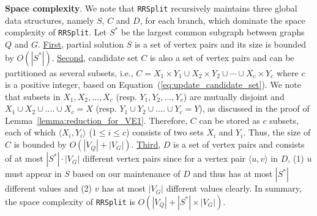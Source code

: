 \smallskip
\noindent\textbf{Space complexity}. We note that \texttt{RRSplit} recursively maintains three global data structures, namely $S$, $C$ and $D$, for each branch, which dominate the space complexity of \texttt{RRSplit}. Let $S^*$ be the largest common subgraph between  graphs $Q$ and $G$. \underline{First}, partial solution $S$ is a set of vertex pairs and its size is bounded by $O(|S^*|)$. \underline{Second}, candidate set $C$ is also a set of vertex pairs and can be partitioned as several subsets, i.e., $C= X_1\times Y_1 \cup  X_2\times Y_2\cup\cdots\cup X_c\times Y_c$ where $c$ is a positive integer, based on Equation~(\ref{eq:update_candidate_set}). We note that subsets in $X_1,X_2,...,X_c$ (resp. $Y_1,Y_2,...,Y_c$) are mutually disjoint and $X_1\cup X_2\cup .... \cup X_c=X$ (resp. $Y_1\cup Y_2\cup .... \cup Y_c=Y$), as discussed in the proof of Lemma~\ref{lemma:reduction_for_VE1}. Therefore, $C$ can be stored {\chengC as} $c$ subsets, each of which $\langle X_i,Y_i\rangle$ ($1\leq i\leq c$) consists of two sets $X_i$ and $Y_i$. Thus, the size of $C$ is bounded by $O(|V_Q|+|V_G|)$. \underline{Third}, $D$ is a set of vertex pairs and consists of at most $|S^*|\cdot |V_G|$ different vertex pairs since for a vertex pair $\langle u,v \rangle$ in $D$, (1) $u$ must {\chengB appear} in $S$ based on our maintenance of $D$ and thus has at most $|S^*|$ different values and (2) $v$ has at most $|V_G|$ different values clearly. In summary, the space complexity of \texttt{RRSplit} is $O(|V_Q|+|S^*|\times|V_G|)$. %

